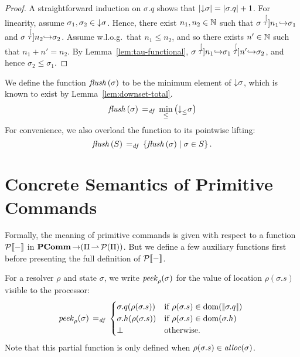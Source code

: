 \documentclass[11pt]{report}
\begin{document}
\begin{proof}
	A straightforward induction on $\sigma.q$ shows that $\left|\operatorname{\downarrow}\!\sigma\right| = |\sigma.q| + 1$. For linearity, assume $\sigma_1, \sigma_2 \in \operatorname{\downarrow}\!\sigma$. Hence, there exist $n_1, n_2 \in \mathbb{N}$ such that $\sigma \stackrel[\tau]{n_1}{\operatorname{\hookrightarrow}} \sigma_1$ and $\sigma \stackrel[\tau]{n_2}{\operatorname{\hookrightarrow}} \sigma_2$. Assume w.l.o.g.~that $n_1 \leq n_2$, and so there exists $n' \in \mathbb{N}$ such that $n_1 + n' = n_2$. By Lemma~\ref{lem:tau-functional}, $\sigma \stackrel[\tau]{n_1}{\operatorname{\hookrightarrow}} \sigma_1 \stackrel[\tau]{n'}{\operatorname{\hookrightarrow}} \sigma_2$, and hence $\sigma_2 \leq \sigma_1$. 
\end{proof}


We define the function $\mathit{flush}\left(\sigma\right)$ to be the minimum element of $\operatorname{\downarrow}\!\sigma$, which is known to exist by Lemma~\ref{lem:downset-total}. 
\begin{equation}
	\label{eq:sflush}
	\mathit{flush}\left(\sigma\right) \operatorname{\;=_{\mathit{df}}\;} \min_{\leq}\left(\operatorname{\downarrow}_{\leq}\!\sigma\right)
\end{equation}
For convenience, we also overload the function to its pointwise lifting: \[ \mathit{flush}\left(S\right) \operatorname{\;=_{\mathit{df}}\;} \left\lbrace \mathit{flush}\left(\sigma\right) \mid \sigma \in S \right\rbrace.\]



\section{Concrete Semantics of Primitive Commands} %
\label{sec:concrete_semantics_of_primitive_commands}

Formally, the meaning of primitive commands is given with respect to a function $\mathcal{P}[\![-]\!]$ in $\mathbf{PComm} \operatorname{\rightarrow} (\Pi \operatorname{\rightharpoonup} \mathcal{P}(\Pi))$. But we define a few auxiliary functions first before presenting the full definition of $\mathcal{P}[\![-]\!]$. 

For a resolver $\rho$ and state $\sigma$,  we write $\mathit{peek}_{\rho}(\sigma)$ for the value of location $\rho(\sigma.s)$ visible to the processor: \begin{equation}
	\label{eq:speek}
	\mathit{peek}_{\rho}(\sigma) \operatorname{\;=_{\mathit{df}}\;} \begin{cases}
		\sigma.q(\rho(\sigma.s)) & \text{if $\rho(\sigma.s) \in \operatorname{\mathrm{dom}}(|\!|\sigma.q|\!|)$ } \\
		\sigma.h(\rho(\sigma.s)) & \text{if $\rho(\sigma.s) \in \operatorname{\mathrm{dom}}(\sigma.h)$} \\
		\bot & \text{otherwise.}
	\end{cases} 
\end{equation}
Note that this partial function is only defined when $\rho(\sigma.s) \in 
\mathit{alloc}(\sigma)$. 
\end{document}
